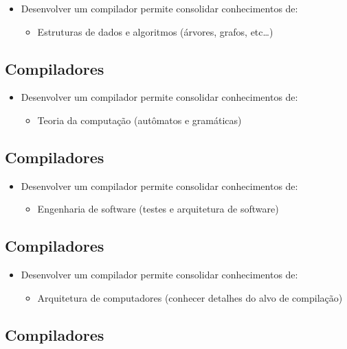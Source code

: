 \documentclass[11pt]{article}
\begin{document}
\begin{itemize}
\item Desenvolver um compilador permite consolidar conhecimentos de:
\begin{itemize}
\item Estruturas de dados e algoritmos (árvores, grafos, etc\ldots{})
\end{itemize}
\end{itemize}
\subsection*{Compiladores}
\label{sec:org2899906}

\begin{itemize}
\item Desenvolver um compilador permite consolidar conhecimentos de:
\begin{itemize}
\item Teoria da computação (autômatos e gramáticas)
\end{itemize}
\end{itemize}
\subsection*{Compiladores}
\label{sec:org31b4d5e}

\begin{itemize}
\item Desenvolver um compilador permite consolidar conhecimentos de:
\begin{itemize}
\item Engenharia de software (testes e arquitetura de software)
\end{itemize}
\end{itemize}
\subsection*{Compiladores}
\label{sec:org2ce5d54}

\begin{itemize}
\item Desenvolver um compilador permite consolidar conhecimentos de:
\begin{itemize}
\item Arquitetura de computadores (conhecer detalhes do alvo de compilação)
\end{itemize}
\end{itemize}
\subsection*{Compiladores}
\label{sec:org7b157d7}
\end{document}
